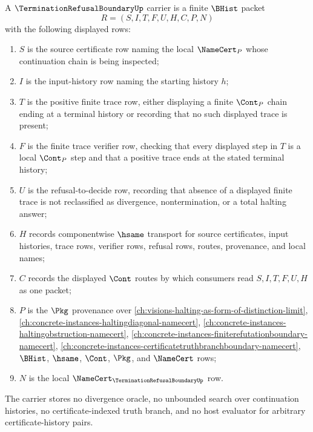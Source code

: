 \begin{definition}
\label{def:termination-refusal-boundary-carrier}
A $\TerminationRefusalBoundaryUp$ carrier is a finite $\BHist$ packet
$$
R=(S,I,T,F,U,H,C,P,N)
$$
with the following displayed rows:
\begin{enumerate}
\item $S$ is the source certificate row naming the local $\NameCert_P$ whose continuation chain is being inspected;
\item $I$ is the input-history row naming the starting history $h$;
\item $T$ is the positive finite trace row, either displaying a finite $\Cont_P$ chain ending at a terminal history or recording that no such displayed trace is present;
\item $F$ is the finite trace verifier row, checking that every displayed step in $T$ is a local $\Cont_P$ step and that a positive trace ends at the stated terminal history;
\item $U$ is the refusal-to-decide row, recording that absence of a displayed finite trace is not reclassified as divergence, nontermination, or a total halting answer;
\item $H$ records componentwise $\hsame$ transport for source certificates, input histories, trace rows, verifier rows, refusal rows, routes, provenance, and local names;
\item $C$ records the displayed $\Cont$ routes by which consumers read $S,I,T,F,U,H$ as one packet;
\item $P$ is the $\Pkg$ provenance over \autoref{ch:visions-halting-as-form-of-distinction-limit}, \autoref{ch:concrete-instances-haltingdiagonal-namecert}, \autoref{ch:concrete-instances-haltingobstruction-namecert}, \autoref{ch:concrete-instances-finiterefutationboundary-namecert}, \autoref{ch:concrete-instances-certificatetruthbranchboundary-namecert}, $\BHist$, $\hsame$, $\Cont$, $\Pkg$, and $\NameCert$ rows;
\item $N$ is the local $\NameCert_{\TerminationRefusalBoundaryUp}$ row.
\end{enumerate}
The carrier stores no divergence oracle, no unbounded search over continuation histories, no certificate-indexed truth branch, and no host evaluator for arbitrary certificate-history pairs.
\end{definition}

